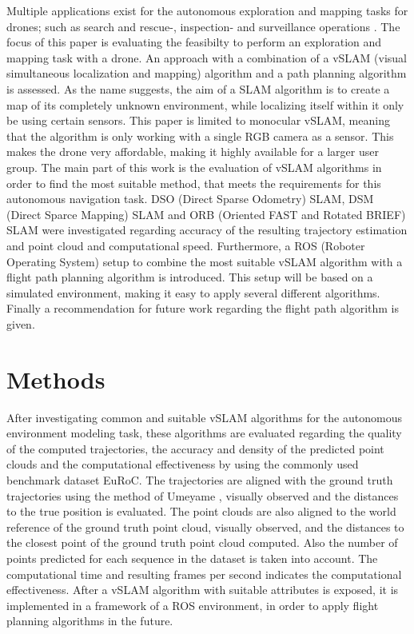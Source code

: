 \documentclass[runningheads]{llncs}
\begin{document}
Multiple applications exist for the autonomous exploration and mapping tasks for drones; such as search and rescue-, inspection- and surveillance operations \cite{tasks}. The focus of this paper is evaluating the feasibilty to perform an exploration and mapping task with a drone.
An approach with a combination of a vSLAM (visual simultaneous localization
and mapping) algorithm and a path planning algorithm is assessed. As the name 
suggests, the aim of a SLAM algorithm is to create a map of its completely unknown environment, while localizing itself within it only be using certain sensors. This paper is limited to monocular vSLAM, meaning that the algorithm is only working with a single RGB camera as a sensor. This makes the drone very affordable, making it highly available for a larger user group.  
The main part of this work is the evaluation of vSLAM algorithms in order to find the 
most suitable method, that meets the requirements for this autonomous navigation task. DSO (Direct Sparse Odometry) SLAM, DSM (Direct Sparce Mapping) SLAM and ORB (Oriented FAST and Rotated BRIEF) SLAM were investigated regarding accuracy of the resulting trajectory estimation and point cloud and computational speed. 
Furthermore, a ROS (Roboter Operating System) setup to combine the most suitable vSLAM algorithm with a flight path planning algorithm is introduced. This setup will be based on a simulated environment, making it easy to apply several different algorithms. Finally a recommendation for future work regarding 
the flight path algorithm is given.



\section{Methods}

After investigating common and suitable vSLAM algorithms for the autonomous
environment modeling task, these algorithms are evaluated regarding the 
quality of the computed trajectories, the accuracy and density of the predicted point clouds and the computational effectiveness by using the commonly used benchmark dataset EuRoC. 
The trajectories are aligned with the ground truth trajectories using the method of Umeyame \cite{ume}, visually
observed and the distances to the true position is evaluated. 
The point clouds are also aligned to the world reference of the ground truth point cloud, visually observed, and the distances to the closest point of 
the ground truth point cloud computed. Also the number of points predicted for 
each sequence in the dataset is taken into account. 
The computational time and resulting frames per second indicates the computational effectiveness. 
After a vSLAM algorithm with suitable attributes is exposed, it is 
implemented in a framework of a ROS environment, in order to apply 
flight planning algorithms in the future. 
\end{document}
